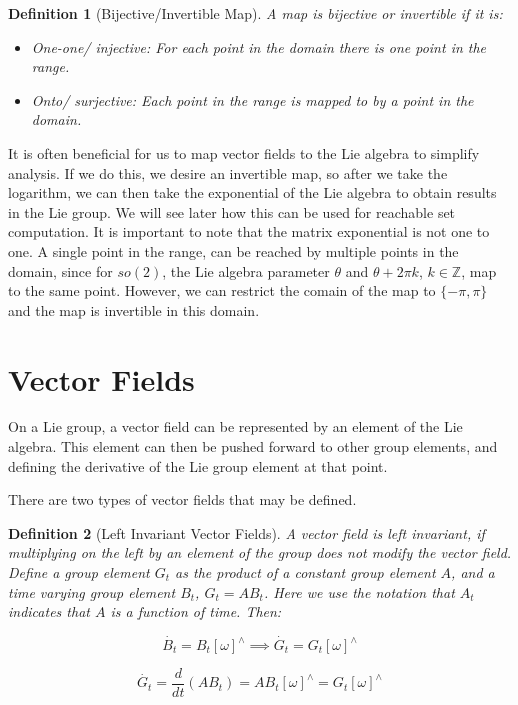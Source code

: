 \documentclass{book}
\newtheorem{definition}{Definition}
\begin{document}
\begin{definition}[Bijective/Invertible Map]
A map is bijective or invertible if it is:
\begin{itemize}
    \item One-one/ injective: For each point in the domain there is one point in the range.
    \item Onto/ surjective: Each point in the range is mapped to by a point in the domain.
\end{itemize}
\end{definition}

It is often beneficial for us to map vector fields to the Lie algebra to simplify
analysis. If we do this, we desire an invertible map, so after we take the logarithm,
we can then take the exponential of the Lie algebra to obtain results in the Lie group.
We will see later how this can be used for reachable set computation. It is important
to note that the matrix exponential is not one to one. A single point in the range, can be
reached by multiple points in the domain, since for $so(2)$, the Lie algebra parameter $\theta$ 
and $\theta + 2\pi k$, $k\in \mathbb{Z}$, map to the same point. However, we can restrict the
comain of the map to $\{-\pi, \pi\}$ and the map is invertible in this domain.

\section{Vector Fields}

On a Lie group, a vector field can be represented by an element of the Lie algebra. This element
can then be pushed forward to other group elements, and defining the derivative of the Lie group
element at that point.

There are two types of vector fields that may be defined.

\begin{definition}[Left Invariant Vector Fields]
A vector field is left invariant, if multiplying on the left by an element of the
group does not modify the vector field. Define a group element $G_t$ as the product of a constant group element $A$, and a time
varying group element $B_t$, $G_t = A B_t$. Here we use the notation that
 $A_t$ indicates that $A$ is a function of time. Then:

$$\dot{B_t} = B_t [\omega]^{\wedge} \implies \dot{G_t} = G_t [\omega]^{\wedge} $$

$$\dot{G_t} = \dfrac{d}{dt} \left(A B_t \right) = A B_t [\omega]^{\wedge} = G_t [\omega]^{\wedge} $$
\end{definition}
\end{document}

